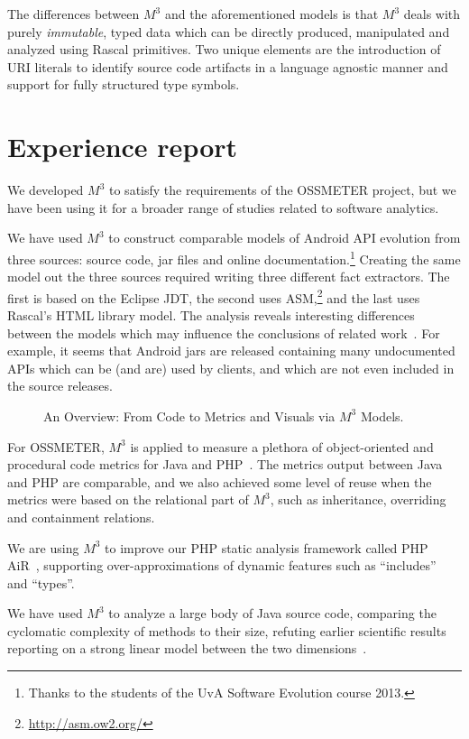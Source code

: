 \documentclass[conference]{IEEEtran}
\newcommand{\mthree}{\ensuremath{M^3}\xspace}
\begin{document}
The differences between \mthree and the aforementioned models is that \mthree
deals with purely \emph{immutable}, typed data which can be directly
produced, manipulated and analyzed using Rascal primitives. Two unique
elements are the introduction of URI literals to identify source code
artifacts in a language agnostic manner and support for fully structured type
symbols.

\section{Experience report}

We developed \mthree to satisfy the requirements of the OSSMETER project, but
we have been using it for a broader range of studies related to software
analytics.

We have used \mthree to construct comparable models of Android API evolution
from three sources: source code, jar files and online
documentation.\!\footnote{Thanks to the students of the UvA Software
Evolution course 2013.}
Creating the same model out the three sources required writing three different
fact extractors. The first is based on the Eclipse JDT, the second uses
ASM,\!\footnote{\url{http://asm.ow2.org/}} and the last uses Rascal's HTML
library model. The analysis reveals interesting differences between the models
which may influence the conclusions of related work~\cite{apianalysis}. For
example, it seems that Android jars are released containing many undocumented
APIs which can be (and are) used by clients, and which are not even included
in the source releases.

\begin{figure}[t]
	\resizebox{\columnwidth}{!}{}
\caption{An Overview: From Code to Metrics and Visuals via \mthree Models.}
\vspace{-6mm}
\end{figure}
For OSSMETER, \mthree is applied to measure a plethora of object-oriented and
procedural code metrics for Java and PHP~\cite{mood,ck}. The metrics output
between Java and PHP are comparable, and we also achieved some level of reuse
when the metrics were based on the relational part of \mthree, such as
inheritance, overriding and containment relations.

We are using \mthree to improve our PHP static analysis framework called PHP
AiR~\cite{phpair}, supporting over-approximations of dynamic features such as
``includes''~\cite{ase2014} and ``types''.

We have used \mthree to analyze a large body of Java source code, comparing
the cyclomatic complexity of methods to their size, refuting earlier
scientific results reporting on a strong linear model between the two
dimensions~\cite{davy}.
\end{document}
